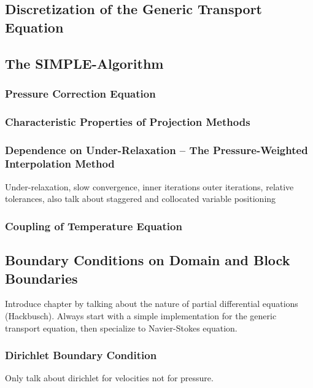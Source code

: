     \subsection{Discretization of the Generic Transport Equation}

    \subsection{The SIMPLE-Algorithm}
      
      \subsubsection{Pressure Correction Equation}

      \subsubsection{Characteristic Properties of Projection Methods}

      \subsubsection{Dependence on Under-Relaxation -- The Pressure-Weighted Interpolation Method}

        Under-relaxation, slow convergence, inner iterations outer iterations, relative tolerances, also talk about staggered and collocated variable positioning

      \subsubsection{Coupling of Temperature Equation}

    \subsection{Boundary Conditions on Domain and Block Boundaries}

        Introduce chapter by talking about the nature of partial differential equations (Hackbusch). Always start with a simple implementation for the generic transport equation, then specialize to Navier-Stokes equation.

      \subsubsection{Dirichlet Boundary Condition}

        Only talk about dirichlet for velocities not for pressure.

